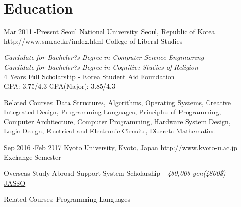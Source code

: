 \documentclass[10pt]{article} %
\begin{document}

\section{Education}

\job
{Mar 2011 -}{Present}
{Seoul National University, Seoul, Republic of Korea}
{http://www.snu.ac.kr/index.html}
{College of Liberal Studies}
{
\textit{Candidate for Bachelor?s Degree in Computer Science Engineering}\\
\textit{Candidate for Bachelor?s Degree in Cognitive Studies of Religion}\\
4 Years Full Scholarship - \href{http://eng.kosaf.go.kr/jsp/main.jsp}{Korea Student Aid Foundation}\\
GPA: 3.75/4.3 \hspace{10mm} GPA(Major): 3.85/4.3\\
\rule{0mm}{5mm}{Related Courses:} Data Structures, Algorithms, Operating Systems, Creative Integrated Design, Programming Languages, Principles of Programming, Computer Architecture, Computer Programming, Hardware System Design, Logic Design, Electrical and Electronic Circuits, Discrete Mathematics
}


\job
{Sep 2016 -}{Feb 2017}
{Kyoto University, Kyoto, Japan}
{http://www.kyoto-u.ac.jp}
{Exchange Semester}
{
Overseas Study Abroad Support System Scholarship - \textit{480,000 yen(4800\$)} \href{http://www.jasso.go.jp/ryugaku/tantosha/study_a/short_term_h/index.html}{JASSO}\\
\rule{0mm}{5mm}{Related Courses:} Programming Languages
}

\end{document}
